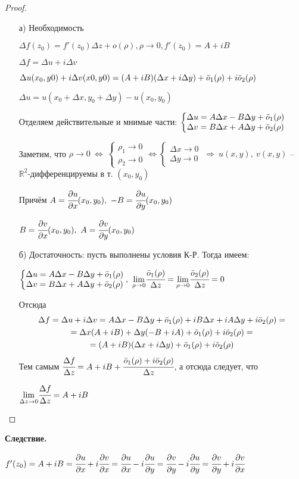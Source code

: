 \documentclass[final]{report}
\newcommand{\forcenewline}{$\phantom{\mbox{newline}}$\newline}
\newcommand{\dd}{\partial}
\newcommand{\then}{\ \Rightarrow\ }
\newcommand{\R}{\mathbb{R}}
\newcommand{\mlim}[1]{\underset{#1}{\lim}}
\newcommand{\LRA}{\Leftrightarrow}
\newcommand{\D}{\Delta}
\renewcommand{\o}{\Bar{o}}
\newcommand{\sys}[1]{\left\{\begin{matrix}#1\end{matrix}\right.}
\theoremstyle{remark}
\begin{document}
\begin{proof}
\forcenewline
\begin{itemize}
\item[а)] Необходимость

$\D f(z_0)=f'(z_0)\D z+o(\rho), \rho \to 0, f'(z_0)=A+iB$

$\D f=\D u+i\D v$

$\D u(x_0,y0)+i\D v(x0,y0)=(A+iB)(\D x+i\D y)+\o_1(\rho)+i\o_2(\rho)$

$\D u=u(x_0+\D x,y_0+\D y)-u(x_0,y_0)$

Отделяем действительные и мнимые части:
$\sys{\D u=A\D x-B\D y+\o_1(\rho) \\ \D v=B\D x+A\D y+\o_2(\rho)}$%

Заметим, что $\rho\to 0\ \LRA\ \sys{\rho_1 \to 0 \\ \rho_2 \to 0} \LRA \sys{\D x\to 0 \\ \D y\to 0} \then u(x,y),\ v(x,y)$ -- $\R^2$-дифференцируемы в т. $(x_0,y_0)$

Причём $A=\cfrac{\dd u}{\dd x}(x_0,y_0),\ -B=\cfrac{\dd u}{\dd y}(x_0,y_0)$

$B=\cfrac{\dd v}{\dd x}(x_0,y_0),\ A=\cfrac{\dd v}{\dd y}(x_0,y_0)$

\item[б)] Достаточность: пусть выполнены условия К-Р. Тогда имеем:

$\sys{\D u=A\D x-B\D y+\o_1(\rho)\\\D v=B\D x+A\D y+\o_2(\rho)},\ \mlim{\rho\to 0}\cfrac{\o_1(\rho)}{\D z}=\mlim{\rho\to0}\cfrac{\o_2(\rho)}{\D z}=0$

Отсюда
\begin{multline*}
\D f=\D u+i\D v=A\D x-B\D y+\o_1(\rho)+iB\D x+iA\D y+i\o_2(\rho)=\\
=\D x(A+iB)+\D y(-B+iA)+\o_1(\rho)+i\o_2(\rho)=\\
=(A+iB)(\D x+i\D y)+\o_1(\rho)+i\o_2(\rho)
\end{multline*}
Тем самым $\cfrac{\D f}{\D z}=A+iB+\cfrac{\o_1(\rho)+i\o_2(\rho)}{\D z}$, а отсюда следует, что

$\mlim{\D z\to0}\cfrac{\D f}{\D z}=A+iB$

\end{itemize}
\end{proof}
{\bfseries Следствие.}

$f'(z_0)=A+iB=\cfrac{\dd u}{\dd x}+i\cfrac{\dd v}{\dd x}=\cfrac{\dd u}{\dd x}-i\cfrac{\dd u}{\dd y}=\cfrac{\dd v}{\dd y}-i\cfrac{\dd u}{\dd y}=\cfrac{\dd v}{\dd y}+i\cfrac{\dd v}{\dd x}$
\end{document}
